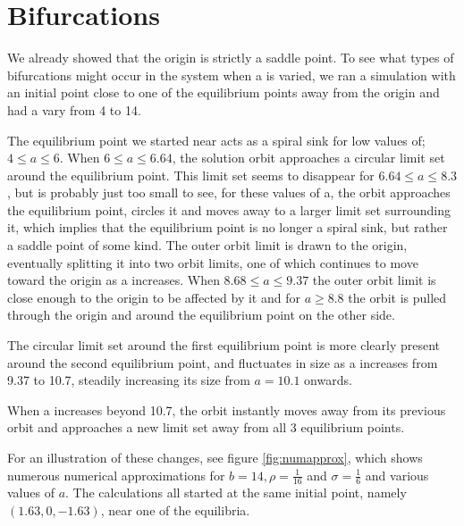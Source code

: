 \section{Bifurcations}

We already showed that the origin is strictly a saddle point. To see
what types of bifurcations might occur in the system when a is varied,
we ran a simulation with an initial point close to one of the
equilibrium points away from the origin and had a vary from 4 to 14.

The equilibrium point we started near acts as a spiral sink for low
values of; $4 \leq a \leq 6$. When $6 \leq a \leq 6.64$, the solution
orbit approaches a circular limit set around the equilibrium
point. This limit set seems to disappear for $6.64 \leq a \leq 8.3$,
but is probably just too small to see, for these values of a, the
orbit approaches the equilibrium point, circles it and moves away to a
larger limit set surrounding it, which implies that the equilibrium
point is no longer a spiral sink, but rather a saddle point of some
kind. The outer orbit limit is drawn to the origin, eventually
splitting it into two orbit limits, one of which continues to move
toward the origin as a increases. When $8.68 \leq a \leq 9.37$ the
outer orbit limit is close enough to the origin to be affected by it
and for $a \geq 8.8$ the orbit is pulled through the origin and around
the equilibrium point on the other side.

The circular limit set around the first equilibrium point is more
clearly present around the second equilibrium point, and fluctuates in
size as a increases from 9.37 to 10.7, steadily increasing its size
from $a=10.1$ onwards.

When a increases beyond 10.7, the orbit instantly moves away from its
previous orbit and approaches a new limit set away from all 3
equilibrium points.

For an illustration of these changes, see figure \ref{fig:numapprox},
which shows numerous numerical approximations for $b = 14, \rho =
\frac{1}{16}$ and $\sigma = \frac{1}{6}$ and various values of $a$.
The calculations all started at the same initial point, namely $(1.63,
0, -1.63)$, near one of the equilibria.

